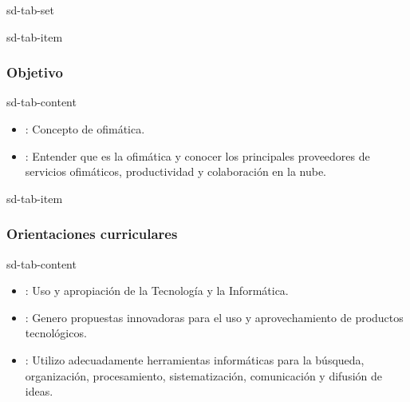 \documentclass[letterpaper,10pt,spanish]{sphinxmanual}
\begin{document}
\begin{sphinxuseclass}{sd-tab-set}
\begin{sphinxuseclass}{sd-tab-item}\subsubsection*{Objetivo}

\begin{sphinxuseclass}{sd-tab-content}
\sphinxAtStartPar
{}
\begin{itemize}
\item {} 
\sphinxAtStartPar
{}: Concepto de ofimática.

\item {} 
\sphinxAtStartPar
{}: Entender que es la ofimática y conocer los principales proveedores de servicios ofimáticos, productividad y colaboración en la nube.

\end{itemize}

\end{sphinxuseclass}
\end{sphinxuseclass}
\begin{sphinxuseclass}{sd-tab-item}\subsubsection*{Orientaciones curriculares}

\begin{sphinxuseclass}{sd-tab-content}\begin{itemize}
\item {} 
\sphinxAtStartPar
{}: Uso y apropiación de la Tecnología y la Informática.

\item {} 
\sphinxAtStartPar
{}: Genero propuestas innovadoras para el uso y aprovechamiento de productos tecnológicos.

\item {} 
\sphinxAtStartPar
{}: Utilizo adecuadamente herramientas informáticas para la búsqueda, organización, procesamiento, sistematización, comunicación y difusión de ideas.


\end{itemize}
\end{sphinxuseclass}
\end{sphinxuseclass}
\end{sphinxuseclass}
\end{document}
